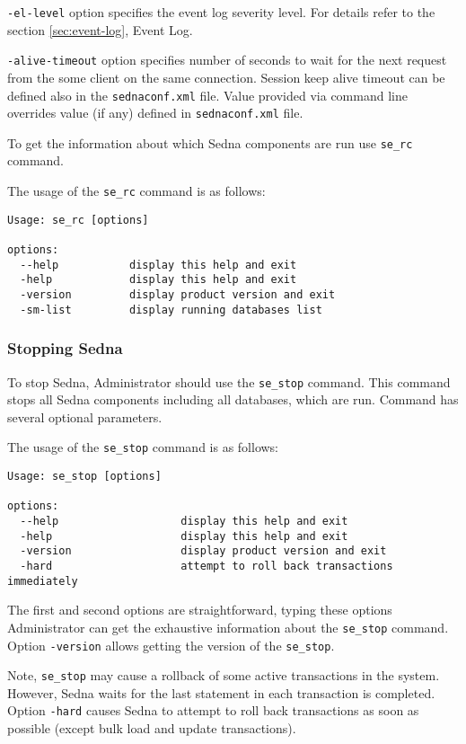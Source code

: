 \documentclass[a4paper,12pt]{article}
\begin{document}
\verb!-el-level! option specifies the event log severity level. For details refer to the section \ref{sec:event-log}, Event Log.

\verb!-alive-timeout! option specifies number of seconds to wait for the next request from the some client on the same connection.
Session keep alive timeout can be defined also in the \verb!sednaconf.xml! file.
Value provided via command line overrides value (if any) defined in \verb!sednaconf.xml! file.

To get the information about which Sedna components are run use \verb!se_rc! command.

The usage of the \verb!se_rc! command is as follows:

\begin{verbatim}
Usage: se_rc [options]

options:
  --help		   display this help and exit
  -help			   display this help and exit
  -version		   display product version and exit
  -sm-list         display running databases list
\end{verbatim}


\subsubsection{Stopping Sedna}

To stop Sedna, Administrator should use the \verb!se_stop! command. This command stops all Sedna components including all databases, which are run. Command has several optional parameters. 

The usage of the \verb!se_stop! command is as follows:

\begin{verbatim}
Usage: se_stop [options]

options:
  --help                   display this help and exit
  -help                    display this help and exit
  -version                 display product version and exit
  -hard                    attempt to roll back transactions immediately
\end{verbatim}
The first and second options are straightforward, typing these options Administrator can get the exhaustive information about the \verb!se_stop! command. Option \verb!-version! allows getting the version of the \verb!se_stop!.

Note, \verb!se_stop! may cause a rollback of some active transactions in the system. However, Sedna waits for the last statement in each transaction is completed.
Option \verb!-hard! causes Sedna to attempt to roll back transactions as soon as possible (except bulk load and update transactions).
\end{document}
